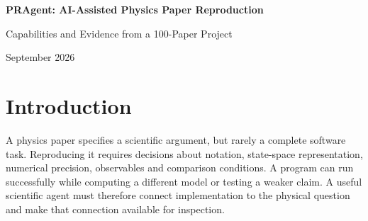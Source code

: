 \documentclass[10pt,a4paper]{article}
\begin{document}
\begin{center}
{\LARGE\bfseries PRAgent: AI-Assisted Physics Paper Reproduction\par}
\vspace{6pt}
{\large Capabilities and Evidence from a 100-Paper Project\par}
\vspace{8pt}

{\small September 2026\par}
\end{center}
\begin{abstract}
PRAgent connects physics-paper interpretation, numerical implementation and scientific assessment in a human-guided research workflow. We examine the system through public implementations and a documentary audit of a fixed 100-paper project. Three cases provide concrete evidence: resource-bound code that refines large integer decisions with 60-digit arithmetic; quantum dynamics implemented in conserved particle sectors; and finite-ensemble discord calculations that expose a discrepancy with an analytical reference. A surface-code case illustrates a system-level distinction: checks pass for an implemented repetition-code proxy, while the original paper target remains unaccepted. To evaluate the breadth of these results, we trace 3,241 archived result-object records from 95 papers to their declared comparison conditions and references, and reconcile summary and detailed assessment records. This audit finds that the 26 papers with all associated checks historically labelled reproduced and the 26 with summary-level review marked passed are disjoint. Consequently, check-label fractions cannot serve as a scientific reproduction rate. The contribution is an inspectable implementation and assessment workflow, supported by numerical examples and explicit evidence links. The archive establishes bounded capabilities within that workflow; it does not yet establish an autonomous-agent success rate or complete reproduction of the cohort.

\end{abstract}

\section{Introduction}\label{introduction}

A physics paper specifies a scientific argument, but rarely a complete
software task. Reproducing it requires decisions about notation,
state-space representation, numerical precision, observables and
comparison conditions. A program can run successfully while computing a
different model or testing a weaker claim. A useful scientific agent
must therefore connect implementation to the physical question and make
that connection available for inspection.
\end{document}
